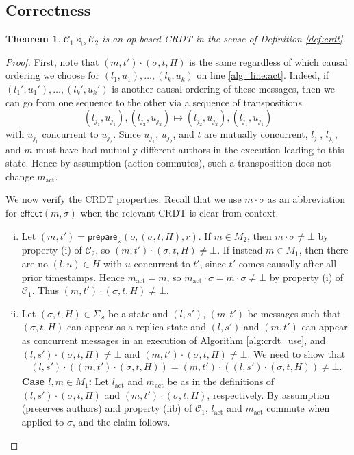 \documentclass[acmsmall,nonacm,12pt]{acmart}
\newcommand{\mc}[1]{\ensuremath{\mathcal{#1}}}
\newcommand{\msf}[1]{\ensuremath{\mathsf{#1}}}
\newcommand{\act}{\triangleright}
\theoremstyle{plain}
\newtheorem{mythm}{Theorem}[section]
\theoremstyle{definition}
\begin{document}
\subsection{Correctness}
\begin{mythm}
\label{thm:correctness}
$\mc{C}_1 \rtimes_\act \mc{C}_2$ is an op-based CRDT in the sense of Definition \ref{def:crdt}.
\end{mythm}
\begin{proof}
First, note that $(m, t') \cdot (\sigma, t, H)$ is the same regardless of which causal ordering we choose for $(l_1, u_1), \dots, (l_k, u_k)$ on line \ref{alg_line:act}.  %
Indeed, if $(l_1', u_1'), \dots, (l_k', u_k')$ is another causal ordering of these messages, then we can go from one sequence to the other via a sequence of transpositions $$(l_{j_1}, u_{j_1}), (l_{j_2}, u_{j_2}) \mapsto (l_{j_2}, u_{j_2}), (l_{j_1}, u_{j_1})$$ with $u_{j_1}$ concurrent to $u_{j_2}$.  Since $u_{j_1}$, $u_{j_2}$, and $t$ are mutually concurrent, $l_{j_1}$, $l_{j_2}$, and $m$ must have had mutually different authors in the execution leading to this state.  Hence by assumption (action commutes), such a transposition does not change $m_{\text{act}}$.

We now verify the CRDT properties.  Recall that we use $m \cdot \sigma$ as an abbreviation for $\msf{effect}(m, \sigma)$ when the relevant CRDT is clear from context.
\begin{enumerate}[(i)]
  \item Let $(m, t') = \msf{prepare}_\rtimes(o, (\sigma, t, H), r)$.  If $m \in M_2$, then $m \cdot \sigma \neq \bot$ by property (i) of $\mc{C}_2$, so $(m, t') \cdot (\sigma, t, H) \neq \bot$.  If instead $m \in M_1$, then there are no $(l, u) \in H$ with $u$ concurrent to $t'$, since $t'$ comes causally after all prior timestamps.  Hence $m_{\text{act}} = m$, so $m_{\text{act}} \cdot \sigma = m \cdot \sigma \neq \bot$ by property (i) of $\mc{C}_1$.  Thus $(m, t') \cdot (\sigma, t, H) \neq \bot$.
  \item Let $(\sigma, t, H) \in \Sigma_\rtimes$ be a state and $(l, s')$, $(m, t')$ be messages such that $(\sigma, t, H)$ can appear as a replica state and $(l, s')$ and $(m, t')$ can appear as concurrent messages in an execution of Algorithm \ref{alg:crdt_use}, and $(l, s') \cdot (\sigma, t, H) \neq \bot$ and $(m, t') \cdot (\sigma, t, H) \neq \bot$.  We need to show that
  \begin{align*}
  (l, s') \cdot ((m, t') \cdot (\sigma, t, H)) = (m, t') \cdot ((l, s') \cdot (\sigma, t, H)) \neq \bot.
  \end{align*}
\textbf{Case $l, m \in M_1$:} Let $l_{\text{act}}$ and $m_{\text{act}}$ be as in the definitions of $(l, s') \cdot (\sigma, t, H)$ and $(m, t') \cdot (\sigma, t, H)$, respectively.  By assumption (preserves authors) and property (iib) of $\mc{C}_1$, $l_{\text{act}}$ and $m_{\text{act}}$ commute when applied to $\sigma$, and the claim follows.
  

\end{enumerate}
\end{proof}
\end{document}

